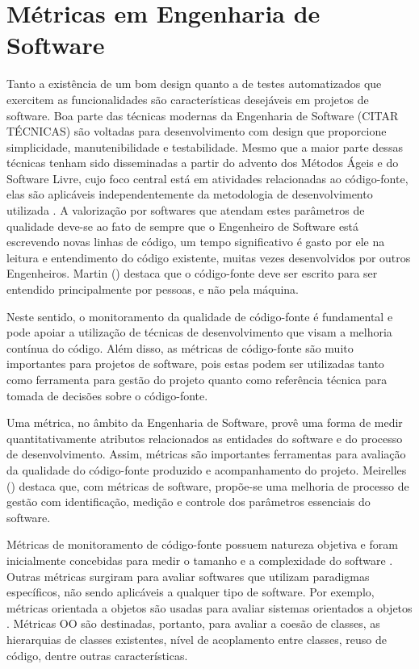 \section{Métricas em Engenharia de Software}
\label{sec-metrics-esw} 
Tanto a existência de um bom design quanto a de testes automatizados que exercitem as funcionalidades são características desejáveis em projetos de software.	Boa parte das técnicas modernas da Engenharia de Software (CITAR TÉCNICAS) são voltadas para desenvolvimento com design que proporcione simplicidade, manutenibilidade e testabilidade. Mesmo que a maior parte dessas técnicas tenham sido disseminadas a partir do advento dos Métodos Ágeis e do Software Livre, cujo foco central está em atividades relacionadas ao código-fonte, elas são aplicáveis independentemente da metodologia de desenvolvimento utilizada \cite{meirelles2013metrics}. A valorização por softwares que atendam estes parâmetros de qualidade deve-se ao fato de sempre que o Engenheiro de Software está escrevendo novas linhas de código, um tempo significativo é gasto por ele na leitura e entendimento do código existente, muitas vezes desenvolvidos por outros Engenheiros. Martin (\citeyear{martin2008}) destaca que o código-fonte deve ser escrito para ser entendido principalmente por pessoas, e não pela máquina.

%

Neste sentido, o monitoramento da qualidade de código-fonte é fundamental e pode apoiar a utilização de técnicas de desenvolvimento que visam a melhoria contínua do código. Além disso, as métricas de código-fonte são muito importantes para projetos de software, pois estas podem ser utilizadas tanto como ferramenta para gestão do projeto quanto como referência técnica para tomada de decisões sobre o código-fonte.

%

Uma métrica, no âmbito da Engenharia de Software, provê uma forma de medir quantitativamente atributos relacionados as entidades do software e do processo de desenvolvimento. Assim, métricas são importantes ferramentas para avaliação da qualidade do código-fonte produzido e acompanhamento do projeto. Meirelles (\citeyear{meirelles2013metrics}) destaca que, com métricas de software, propõe-se uma melhoria de processo de gestão com identificação, medição e controle dos parâmetros essenciais do software.

%

Métricas de monitoramento de código-fonte possuem natureza objetiva e foram inicialmente concebidas para medir o tamanho e a complexidade do software \cite{henry1984kafura}\cite{troy1981zweben}\cite{yau1985zweben}. Outras métricas surgiram para avaliar softwares que utilizam paradigmas específicos, não sendo aplicáveis a qualquer tipo de software. Por exemplo, métricas orientada a objetos são usadas para avaliar sistemas orientados a objetos \cite{systa2000}. Métricas OO são destinadas, portanto, para avaliar a coesão de classes, as hierarquias de classes existentes, nível de acoplamento entre classes, reuso de código, dentre outras características.

